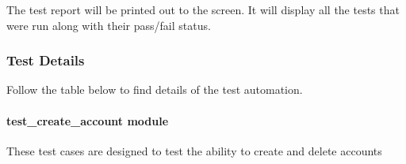 \documentclass[letterpaper,10pt,english]{sphinxmanual}
\begin{document}
The test report will be printed out to the screen. It will display all the tests that were run along with their pass/fail
status.


\subsubsection{Test Details}
\label{STD/pytest_test_descriptions:test-details}
Follow the table below to find details of the test automation.


\paragraph{test\_create\_account module}
\label{STD/test_create_account:test-create-account-module}\label{STD/test_create_account::doc}\label{STD/test_create_account:module-test_create_account}
These test cases are designed to test the ability to create and delete accounts
\end{document}
